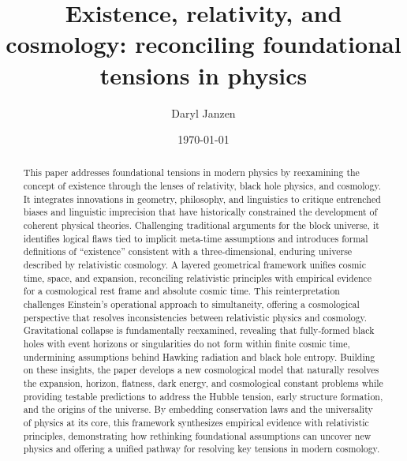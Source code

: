 \documentclass[aps,rmp,groupedaddress,twocolumn,10pt]{revtex4-2}
\begin{document}
\title{Existence, relativity, and cosmology: reconciling foundational tensions in physics}

\author{Daryl Janzen}

\date{\today}

\begin{abstract}
This paper addresses foundational tensions in modern physics by reexamining the concept of existence through the lenses of relativity, black hole physics, and cosmology. It integrates innovations in geometry, philosophy, and linguistics to critique entrenched biases and linguistic imprecision that have historically constrained the development of coherent physical theories. Challenging traditional arguments for the block universe, it identifies logical flaws tied to implicit meta-time assumptions and introduces formal definitions of ``existence'' consistent with a three-dimensional, enduring universe described by relativistic cosmology. A layered geometrical framework unifies cosmic time, space, and expansion, reconciling relativistic principles with empirical evidence for a cosmological rest frame and absolute cosmic time. This reinterpretation challenges Einstein's operational approach to simultaneity, offering a cosmological perspective that resolves inconsistencies between relativistic physics and cosmology. Gravitational collapse is fundamentally reexamined, revealing that fully-formed black holes with event horizons or singularities do not form within finite cosmic time, undermining assumptions behind Hawking radiation and black hole entropy. Building on these insights, the paper develops a new cosmological model that naturally resolves the expansion, horizon, flatness, dark energy, and cosmological constant problems while providing testable predictions to address the Hubble tension, early structure formation, and the origins of the universe. By embedding conservation laws and the universality of physics at its core, this framework synthesizes empirical evidence with relativistic principles, demonstrating how rethinking foundational assumptions can uncover new physics and offering a unified pathway for resolving key tensions in modern cosmology.
\end{abstract}

\end{document}
